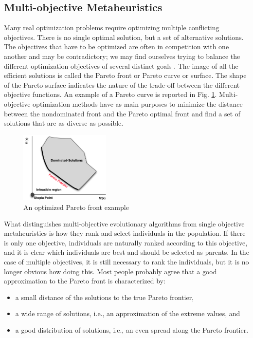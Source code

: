 \documentclass[espaco=umemeio,chapter=TITLE,twoside,openright]{abnt}
\begin{document}
\subsection{Multi-objective Metaheuristics}

Many real optimization problems require optimizing multiple conflicting objectives. There is no single optimal solution, but a set of alternative solutions. The objectives that have to be optimized are often in competition with one another and may be contradictory; we may find ourselves trying to balance the different optimization objectives of several distinct goals \cite{Harman2010}. The image of all the efficient solutions is called the Pareto front or Pareto curve or surface. The shape of the Pareto surface indicates the nature of the trade-off between the different objective functions. An example of a Pareto curve is reported in Fig. \ref{fig:pareto1}. Multi-objective optimization methods have as main purposes to minimize the distance between the nondominated front and the Pareto optimal front and find a set of solutions that are as diverse as possible.

\begin{figure}[h]
\centering
\includegraphics[width=0.4\textwidth]{./images/paretofront.png}
\caption{An optimized Pareto front example}
\label{fig:pareto1}
\end{figure}

What distinguishes multi-objective evolutionary algorithms from single objective metaheuristics is how they rank and select individuals in the population. If there is only one objective, individuals are naturally ranked according to this objective, and it is clear which individuals are best and should be selected as
parents. In the case of multiple objectives, it is still necessary to rank the individuals, but it is no longer obvious how doing this. Most people probably agree that a good approximation to the Pareto front is characterized by:

\begin{itemize}
\item  a small distance of the solutions to the true Pareto frontier,
\item  a wide range of solutions, i.e., an approximation
of the extreme values, and
\item a good distribution of solutions, i.e., an even
spread along the Pareto frontier.
\end{itemize}
\end{document}
